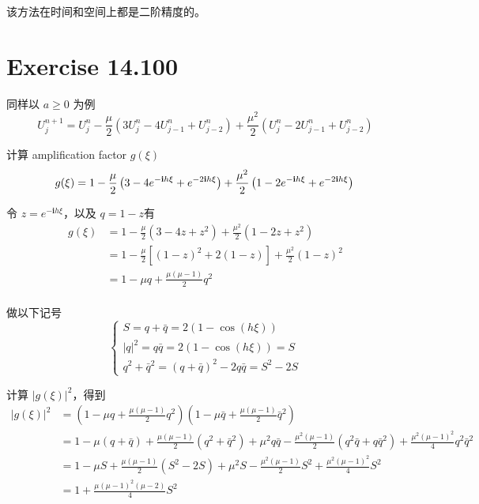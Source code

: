\documentclass[a4paper]{article}
\begin{document}
\par 该方法在时间和空间上都是二阶精度的。

\section*{Exercise 14.100}

\par 同样以 $a \geq 0$ 为例
\begin{equation}
    U_{j}^{n+1}
    = U_{j}^{n} - \frac{\mu}{2}
        \left(
            3U_{j}^{n}-4U_{j-1}^{n}+U_{j-2}^{n}
        \right)
        +\frac{\mu^2}{2}
        \left(
            U_{j}^{n}-2U_{j-1}^{n}+U_{j-2}^{n}
        \right)
\end{equation}
\par 计算 amplification factor $g(\xi)$
\begin{equation}
    g(\xi) = 1 - \frac{\mu}{2}\left(3 - 4e^{-\mathbf{i}h\xi} + e^{-2\mathbf{i}h\xi}\right)
    + \frac{\mu^2}{2}\left(1 - 2e^{-\mathbf{i}h\xi} + e^{-2\mathbf{i}h\xi}\right)\\
\end{equation}
\par 令 $z = e^{-\mathbf{i}h\xi}$，以及 $q=1-z$有
\begin{equation}
    \begin{aligned}
        g(\xi) &= 1 - \frac{\mu}{2}\left(3 - 4z + z^2\right) + \frac{\mu^2}{2}\left(1 - 2z + z^2\right)\\
        &= 1 - \frac{\mu}{2}\left[(1-z)^2+2(1-z)\right] + \frac{\mu^2}{2}\left(1 - z\right)^2\\
        &= 1 - \mu q + \frac{\mu(\mu-1)}{2}q^2\\
    \end{aligned}
\end{equation}
\par 做以下记号
\begin{equation}
    \begin{cases}
        S = q+\bar{q}= 2(1-\cos(h\xi))\\
        |q|^2 = q\bar{q} = 2(1-\cos(h\xi)) = S\\
        q^2 + \bar{q}^2 = (q+\bar{q})^2 - 2q\bar{q} = S^2 - 2S
    \end{cases}
\end{equation}
\par 计算 $|g(\xi)|^2$，得到
\begin{equation}
    \begin{aligned}
        |g(\xi)|^2 &= \left(1 - \mu q + \frac{\mu(\mu-1)}{2}q^2\right)\left(1 - \mu \bar{q} + \frac{\mu(\mu-1)}{2}\bar{q}^2\right)\\
        &= 1 - \mu(q+\bar{q}) + \frac{\mu(\mu-1)}{2}(q^2+\bar{q}^2) + \mu^2 q\bar{q} - \frac{\mu^2(\mu-1)}{2}(q^2\bar
        {q} + q\bar{q}^2) + \frac{\mu^2(\mu-1)^2}{4}q^2\bar{q}^2\\
        &= 1 - \mu S + \frac{\mu(\mu-1)}{2}(S^2 - 2S) + \mu^2 S - \frac{\mu^2(\mu-1)}{2}S^2 + \frac{\mu^2(\mu-1)^2}{4}S^2\\
        &= 1+\frac{\mu(\mu-1)^2(\mu-2)}{4}S^2
    \end{aligned}
\end{equation}
\end{document}
